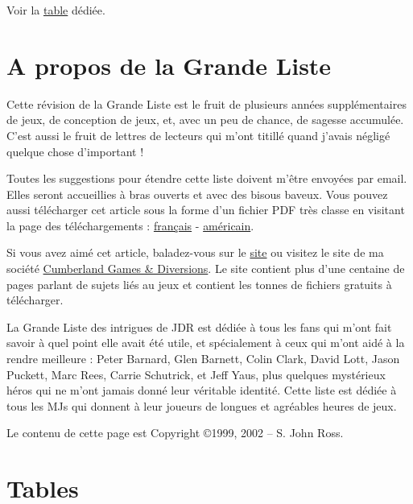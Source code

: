 \begin{multicols}{2}
Voir la \hyperref[petiteliste]{table} dédiée.

\section*{A propos de la Grande Liste}

Cette révision de la Grande Liste est le fruit de plusieurs années supplémentaires de jeux, de conception de jeux, et, avec un peu de chance, de sagesse accumulée. C'est aussi le fruit de lettres de lecteurs qui m'ont titillé quand j'avais négligé quelque chose d'important !

Toutes les suggestions pour étendre cette liste doivent m'être envoyées par email. Elles seront accueillies à bras ouverts et avec des bisous baveux. Vous pouvez aussi télécharger cet article sous la forme d'un fichier PDF très classe en visitant la page des téléchargements : \href{https://rouboudou.itch.io/la-grande-liste-des-intrigues-de-jdr}{français} - \href{https://ghalev.itch.io/big-list-of-rpg-plots}{américain}.

Si vous avez aimé cet article, baladez-vous sur le \href{https://rolltop-indigo.blogspot.com/}{site} ou visitez le site de ma société \href{https://ghalev.itch.io/}{Cumberland Games \& Diversions}. Le site contient plus d'une centaine de pages parlant de sujets liés au jeux et contient les tonnes de fichiers gratuits à télécharger.

La Grande Liste des intrigues de JDR est dédiée à tous les fans qui m'ont fait savoir à quel point elle avait été utile, et spécialement à ceux qui m'ont aidé à la rendre meilleure : Peter Barnard, Glen Barnett, Colin Clark, David Lott, Jason Puckett, Marc Rees, Carrie Schutrick, et Jeff Yaus, plus quelques mystérieux héros qui ne m'ont jamais donné leur véritable identité. Cette liste est dédiée à tous les MJs qui donnent à leur joueurs de longues et agréables heures de jeux.

Le contenu de cette page est Copyright \copyright1999, 2002 -- S. John Ross.

\end{multicols}

\pagebreak

\section*{Tables}

